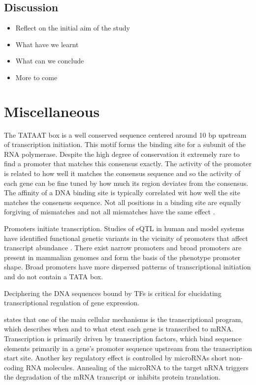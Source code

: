 \documentclass[12pt, onecolumn, oneside]{gsajnl}
\begin{document}
\subsection{Discussion}

\begin{itemize}
\item Reflect on the initial aim of the study
\item What have we learnt
\item What can we conclude
\item More to come
\end{itemize}




\clearpage
\section{Miscellaneous}

The TATAAT box is a well conserved sequence centered around 10 bp upstream of transcription initiation. This motif forms the binding site for a subunit of
the RNA polymerase. Despite the high degree of conservation it extremely rare to find a promoter that matches this consensus exactly. The activity of the
promoter is related to how well it matches the consensus sequence and so the activity of each gene can be fine tuned by how much its region deviates from
the consensus. The affinity of a DNA binding site is typically correlated wit how well the site matches the consensus sequence. Not all positions in a binding
site are equally forgiving of mismatches and not all mismatches have the same effect \citet{d2006dna}.

Promoters initiate transcription. Studies of eQTL in human and model systems have identified functional genetic variants in the vicinity of promoters that affect transcript abundance \citet{schor2017promoter}. There exist narrow promoters and broad promoters are present in mammalian genomes and form
the basis of the phenotype promoter shape. Broad promoters have more dispersed patterns of transcriptional initiation and do not contain a TATA box. 

Deciphering the DNA sequences bound by TFs is critical for elucidating transcriptional regulation of gene expression. 

\citet{linhart2008transcription}  states that one of the main cellular mechanisms is the transcriptional program, which describes when and to what etent each gene is transcribed to mRNA. Transcription is primarily driven by transcription factors, which bind sequence elements primarily in a gene's promoter sequence upstream from the transcription start site. Another key regulatory effect is controlled by microRNAs short non-coding RNA molecules. Annealing of the microRNA to the target nRNA triggers the degradation of the mRNA transcript or inhibits protein translation. 
\end{document}
